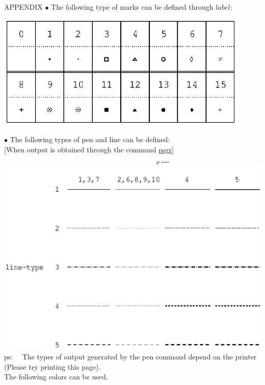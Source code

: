\begin{qsection}{APPENDIX}
\hypertarget{lmark}{}
{\large \hspace{-1.5ex}$\bullet$
The following type of marks can be defined through $label$:}

\begin{center}
\leavevmode
\includegraphics[width=12cm]{fig/mark.eps} \\
\end{center}

\hypertarget{pen-line}{}
{\large \hspace{-1.5ex}$\bullet$
The following types of pen and line can be defined:}\\
\hspace{3mm}[When output is obtained through the command \hyperlink{psgr}{psgr}]

\leavevmode
\includegraphics{fig/pen-line.eps} \\

ps:~~ The types of output generated by the pen command
depend on the printer (Please try printing this page).
\\
\hypertarget{pen-color}{}
The following colors can be used.\\


\end{qsection}
